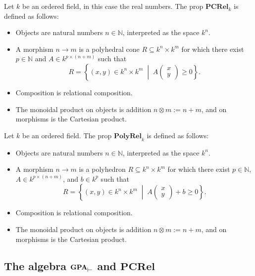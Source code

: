 \begin{definition}
Let $k$ be an ordered field, in this case the real numbers. The prop
$\mathbf{PCRel}_k$ is defined as follows:
\begin{itemize}
    \item Objects are natural numbers $n \in \mathbb{N}$, interpreted
    as the space $k^n$.
    \item A morphism $n \to m$ is a polyhedral cone
    $R \subseteq k^n \times k^m$
    for which there exist $p \in \mathbb{N}$ and
    $A \in k^{p \times (n+m)}$ such that
    \[
    R = \left\{ (x,y) \in k^n \times k^m \;\middle|\;
    A \begin{pmatrix} x \\ y \end{pmatrix} \ge 0 \right\}.
    \]
    \item Composition is relational composition.
    \item The monoidal product on objects is addition $n \otimes m := n+m$,
    and on morphisms is the Cartesian product.
\end{itemize}
\end{definition}

\begin{definition}
Let $k$ be an ordered field. The prop $\mathbf{PolyRel}_k$ is defined
as follows:
\begin{itemize}
    \item Objects are natural numbers $n \in \mathbb{N}$, interpreted
    as the space $k^n$.
    \item A morphism $n \to m$ is a polyhedron
    $R \subseteq k^n \times k^m$
    for which there exist $p \in \mathbb{N}$,
    $A \in k^{p \times (n+m)}$, and $b \in k^p$ such that
    \[
    R = \left\{ (x,y) \in k^n \times k^m \;\middle|\;
    A \begin{pmatrix} x \\ y \end{pmatrix} + b \ge 0 \right\}.
    \]
    \item Composition is relational composition.
    \item The monoidal product on objects is addition $n \otimes m := n+m$,
    and on morphisms is the Cartesian product.
\end{itemize}
\end{definition}

\subsection{The algebra \texorpdfstring{$\mathbf{GPA}_{\rtop}$}{GPA}
and \texorpdfstring{$\mathbf{PCRel}$}{PCRel}}

